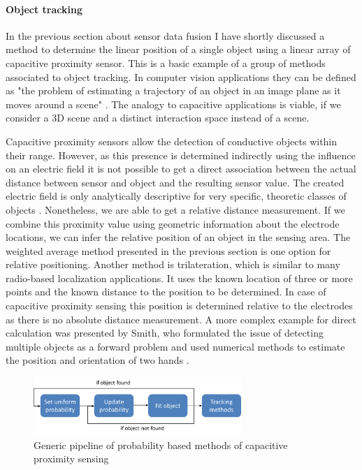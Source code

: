 \paragraph{Object tracking}
In the previous section about sensor data fusion I have shortly discussed a method to determine the linear position of a single object using a linear array of capacitive proximity sensor. This is a basic example of a group of methods associated to object tracking. In computer vision applications they can be defined as "the problem of estimating a trajectory of an object in an image plane as it moves around a scene" \cite{yilmaz2006object}. The analogy to capacitive applications is viable, if we consider a 3D scene and a distinct interaction space instead of a scene. 

Capacitive proximity sensors allow the detection of conductive objects within their range. However, as this presence is determined indirectly using the influence on an electric field it is not possible to get a direct association between the actual distance between sensor and object and the resulting sensor value. The created electric field is only analytically descriptive for very specific, theoretic classes of objects \cite{Baxter1996}. Nonetheless, we are able to get a relative distance measurement. If we combine this proximity value using geometric information about the electrode locations, we can infer the relative position of an object in the sensing area. The weighted average method presented in the previous section is one option for relative positioning. Another method is trilateration, which is similar to many radio-based localization applications. It uses the known location of three or more points and the known distance to the position to be determined. In case of capacitive proximity sensing this position is determined relative to the electrodes as there is no absolute distance measurement. 
A more complex example for direct calculation was presented by Smith, who formulated the issue of detecting multiple objects as a forward problem and used numerical methods to estimate the position and orientation of two hands \cite{smith1999thesis}.
\begin{figure}[h]
\centering
\includegraphics[width=0.7\textwidth]{images/prob_methods}
\caption{Generic pipeline of probability based methods of capacitive proximity sensing}
\label{fig:rel_prob_method}
\end{figure}
